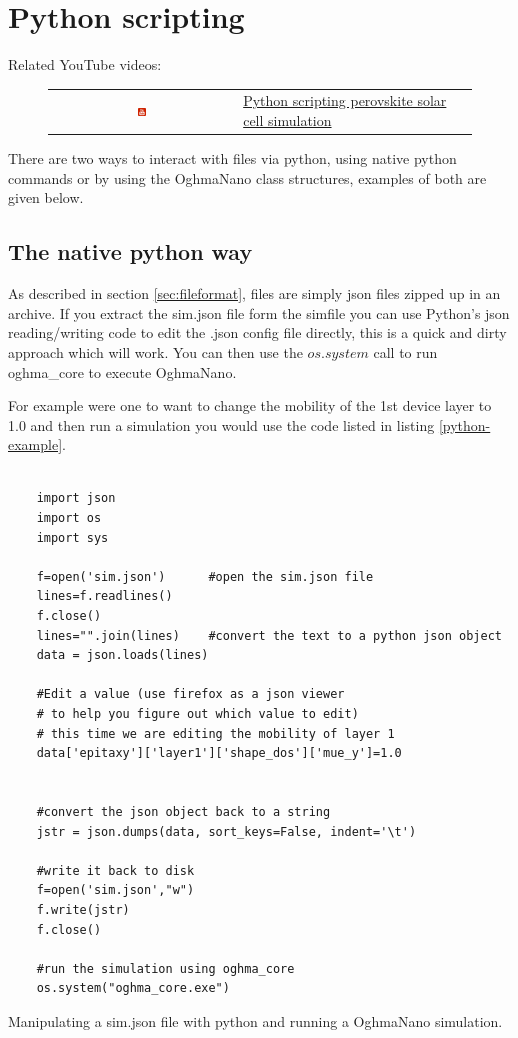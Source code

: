 \section{Python scripting}
\label{sec:pythonscripts}
Related YouTube videos:
\begin{figure}[H]
\begin{tabular}{ c l }

\includegraphics[width=0.05\textwidth]{./images/youtube.png}

&
\href{https://www.youtube.com/watch?v=vyeAzxBZjMg}{Python scripting perovskite solar cell simulation}

\end{tabular}
\end{figure}

There are two ways to interact with \fileext files via python, using native python commands or by using the OghmaNano class structures, examples of both are given below.


\subsection{The native python way}
\label{sec:pythonscripts_native_python}
As described in section \ref{sec:fileformat}, \fileext files are simply json files zipped up in an archive. If you extract the sim.json file form the sim\fileext file you can use Python's json reading/writing code to edit the .json config file directly, this is a quick and dirty approach which will work. You can then use the $os.system$ call to run oghma\_core to execute OghmaNano.

For example were one to want to change the mobility of the 1st device layer to 1.0 and then run a simulation you would use the code listed in listing \ref{python-example}.

\begin{listing}[H]
\begin{verbatim}

	import json
	import os
	import sys

	f=open('sim.json')		#open the sim.json file
	lines=f.readlines()
	f.close()
	lines="".join(lines)	#convert the text to a python json object
	data = json.loads(lines)

	#Edit a value (use firefox as a json viewer
	# to help you figure out which value to edit)
	# this time we are editing the mobility of layer 1
	data['epitaxy']['layer1']['shape_dos']['mue_y']=1.0


	#convert the json object back to a string
	jstr = json.dumps(data, sort_keys=False, indent='\t')

	#write it back to disk
	f=open('sim.json',"w")
	f.write(jstr)
	f.close()

	#run the simulation using oghma_core
	os.system("oghma_core.exe")
\end{verbatim}
\caption{Manipulating a sim.json file with python and running a OghmaNano simulation.} 
\label{python-example}
\end{listing}

